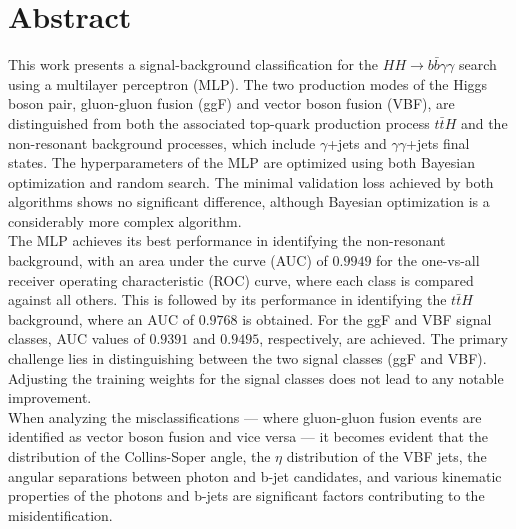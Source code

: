 \section*{Abstract}

This work presents a signal-background classification for the $HH \rightarrow b \bar{b} \gamma \gamma$ search using a multilayer perceptron (MLP).
The two production modes of the Higgs boson pair, gluon-gluon fusion (ggF) and vector boson fusion (VBF), are distinguished from both the associated
top-quark production process $t \bar{t} H$ and the non-resonant background processes, which include $\gamma$+jets and $\gamma \gamma$+jets final states.
The hyperparameters of the MLP are optimized using both Bayesian optimization and random search. The minimal validation loss achieved by both algorithms
shows no significant difference, although Bayesian optimization is a considerably more complex algorithm. \\

The MLP achieves its best performance in identifying the non-resonant background, with an area under the curve (AUC) of $0.9949$ for the one-vs-all
receiver operating characteristic (ROC) curve, where each class is compared against all others. This is followed by its performance in identifying the $t \bar{t} H$ background,
where an AUC of $0.9768$ is obtained.
For the ggF and VBF signal classes, AUC values of $0.9391$ and $0.9495$, respectively, are achieved. The primary challenge lies in distinguishing between the two
signal classes (ggF and VBF).
Adjusting the training weights for the signal classes does not lead to any notable improvement. \\

When analyzing the misclassifications — where gluon-gluon fusion events are identified as vector boson fusion and vice versa — it becomes evident
that the distribution of the Collins-Soper angle, the $\eta$ distribution of the VBF jets, the angular separations between photon and b-jet candidates, and various
kinematic properties of the photons and b-jets are significant factors contributing to the misidentification.